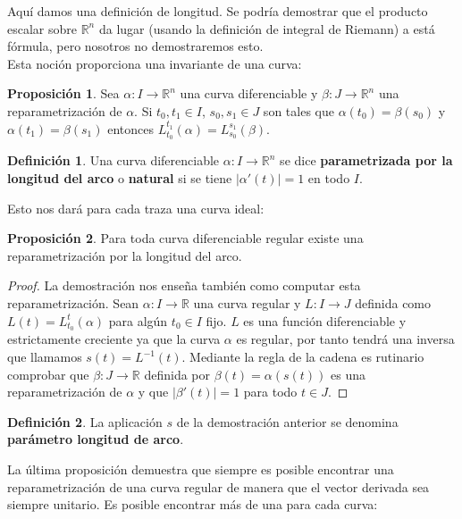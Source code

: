 \documentclass{article}
\theoremstyle{definition}
\newtheorem{prop}{Proposición}
\newtheorem{define}{Definición}
\newcommand{\reales}{\mathbb{R}}
\begin{document}
Aquí damos una definición de longitud. Se podría demostrar que el producto escalar sobre $\reales^{n}$ da lugar (usando la definición de integral de Riemann) a está fórmula, pero nosotros no demostraremos esto.\\ 
Esta noción proporciona una invariante de una curva:

\begin{prop}
	Sea $\alpha: I \rightarrow \reales^{n}$ una curva diferenciable y $\beta: J \rightarrow \reales^{n}$ una reparametrización de $\alpha$. Si $t_0, t_1 \in I$, $s_0, s_1 \in J$ son tales que $\alpha(t_0) = \beta(s_0)$ y $\alpha(t_1) = \beta(s_1)$ entonces $L_{t_0}^{t_1} (\alpha) = L_{s_0}^{s_1} (\beta)$.
\end{prop}

\begin{define}
	Una curva diferenciable $\alpha: I \rightarrow \reales^{n}$ se dice \textbf{parametrizada por la longitud del arco} o \textbf{natural} si se tiene $|\alpha' (t)| = 1$ en todo $I$.
\end{define}

Esto nos dará para cada traza una curva ideal:

\begin{prop}\label{prop_arco_param}
	Para toda curva diferenciable regular existe una reparametrización por la longitud del arco.
\end{prop}

\begin{proof}
	La demostración nos enseña también como computar esta reparametrización. Sean $\alpha : I \rightarrow \reales$ una curva regular y $L : I \rightarrow J$ definida como $L(t) = L_{t_0}^{t}(\alpha)$ para algún $t_0 \in I$ fijo. $L$ es una función diferenciable y estrictamente creciente ya que la curva $\alpha$ es regular, por tanto tendrá una inversa que llamamos $s(t) = L^{-1} (t)$. Mediante la regla de la cadena es rutinario comprobar que $\beta : J \rightarrow \reales$ definida por $\beta(t) = \alpha(s(t))$ es una reparametrización de $\alpha$ y que $|\beta'(t)| = 1$ para todo $t \in J$.
\end{proof}

\begin{define}
	La aplicación $s$ de la demostración anterior se denomina \textbf{parámetro longitud de arco}.
\end{define}

La última proposición demuestra que siempre es posible encontrar una reparametrización de una curva regular de manera que el vector derivada sea siempre unitario. Es posible encontrar más de una para cada curva:
\end{document}

